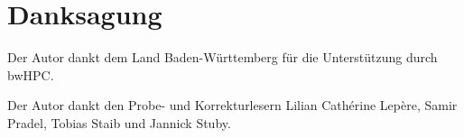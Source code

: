 \chapter{Danksagung}

Der Autor dankt dem Land Baden-Württemberg für die Unterstützung durch bwHPC.

Der Autor dankt den Probe- und Korrekturlesern Lilian Cathérine Lepère, Samir Pradel, Tobias Staib und Jannick Stuby.
